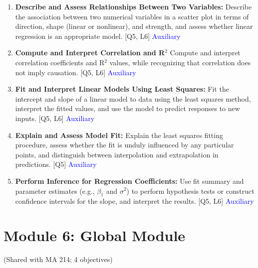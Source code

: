 \documentclass[12pt]{article}
\begin{document}

\begin{enumerate}
    \item \textbf{Describe and Assess Relationships Between Two Variables:} Describe the association between two numerical variables in a scatter plot in terms of direction, shape (linear or nonlinear), and strength, and assess whether linear regression is an appropriate model. [Q5, L6] \textcolor{blue}{Auxiliary} 
    \item \textbf{Compute and Interpret Correlation and R$^2$} Compute and interpret correlation coefficients and R$^2$ values, while recognizing that correlation does not imply causation. [Q5, L6] \textcolor{blue}{Auxiliary}
    \item \textbf{Fit and Interpret Linear Models Using Least Squares:} Fit the intercept and slope of a linear model to data using the least squares method, interpret the fitted values, and use the model to predict responses to new inputs. [Q5, L6] \textcolor{blue}{Auxiliary}
    \item \textbf{Explain and Assess Model Fit:} Explain the least squares fitting procedure, assess whether the fit is unduly influenced by any particular points, and distinguish between interpolation and extrapolation in predictions. [Q5] \textcolor{blue}{Auxiliary}
    \item \textbf{Perform Inference for Regression Coefficients:} Use fit summary and parameter estimates (e.g., $\beta_1$ and $\sigma^2$) to perform hypothesis tests or construct confidence intervals for the slope, and interpret the results. [Q5, L6] \textcolor{blue}{Auxiliary} 
\end{enumerate}

\newpage


\section{Module 6: Global Module}
(Shared with MA 214; 4 objectives)

\end{document}
